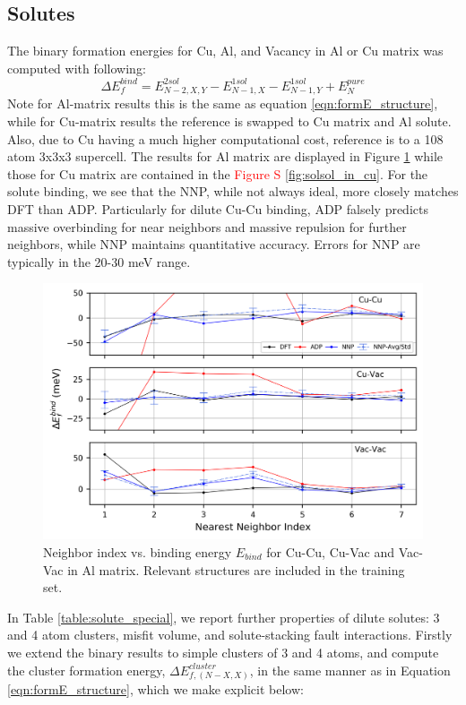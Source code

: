 \documentclass{article}
\begin{document}
\subsection{Solutes}
The binary formation energies for Cu, Al, and Vacancy in Al or Cu matrix was computed with following:
\begin{equation}
\Delta E^{bind}_f = E^{2sol}_{N-2,X,Y}-E^{1sol}_{N-1,X}-E^{1sol}_{N-1,Y}+E^{pure}_N
\end{equation}
Note for Al-matrix results this is the same as equation \ref{eqn:formE_structure}, while for 
Cu-matrix results the reference is swapped to Cu matrix and Al solute.
Also, due to Cu having a much higher computational cost, reference is to a 108 atom 3x3x3 supercell.
The results for Al matrix are displayed in Figure \ref{fig:solsol_in_al} while those for Cu matrix are contained in the \textcolor{red}{Figure S \ref{fig:solsol_in_cu}}.
For the solute binding, we see that the NNP, while not always ideal, more closely matches DFT than ADP.
Particularly for dilute Cu-Cu binding, ADP falsely predicts massive overbinding for near neighbors and massive repulsion for further neighbors, while NNP maintains quantitative accuracy.
Errors for NNP are typically in the 20-30 meV range.


\begin{figure}[H]%
\centering%
\includegraphics[width=1\textwidth,center]{./figures/solsol_in_al.png}%
\caption{Neighbor index vs. binding energy $E_{bind}$ for Cu-Cu, Cu-Vac and Vac-Vac in Al matrix. 
Relevant structures are included in the training set.}%
\label{fig:solsol_in_al}
\end{figure}


In Table \ref{table:solute_special}, we report further properties of dilute solutes: 3 and 4 atom clusters, misfit volume, and solute-stacking fault interactions.
Firstly we extend the binary results to simple clusters of 3 and 4 atoms, and compute the cluster formation energy, $\Delta E^{cluster}_{f,(N-X,X)}$,
in the same manner as in Equation \ref{eqn:formE_structure}, which we make explicit below:
\end{document}
